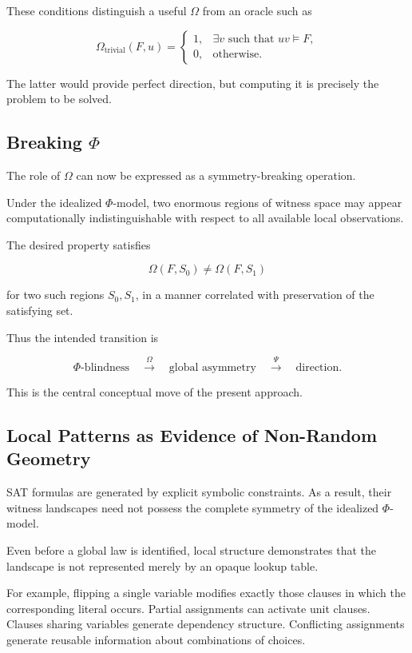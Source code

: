 \documentclass[11pt]{article}
\theoremstyle{plain}
\theoremstyle{definition}
\begin{document}
These conditions distinguish a useful \(\Omega\) from an oracle such as

\[
    \Omega_{\mathrm{trivial}}(F,u)
    =
    \begin{cases}
        1,&\exists v\text{ such that }uv\models F,\\
        0,&\text{otherwise}.
    \end{cases}
\]

The latter would provide perfect direction, but computing it is precisely the
problem to be solved.

\subsection{Breaking \(\Phi\)}

The role of \(\Omega\) can now be expressed as a symmetry-breaking operation.

Under the idealized \(\Phi\)-model, two enormous regions of witness space may
appear computationally indistinguishable with respect to all available local
observations.

The desired property satisfies

\[
    \Omega(F,S_0)\neq\Omega(F,S_1)
\]

for two such regions \(S_0,S_1\), in a manner correlated with preservation of
the satisfying set.

Thus the intended transition is

\[
\boxed{
\Phi\text{-blindness}
\quad
\xrightarrow{\;\Omega\;}
\quad
\text{global asymmetry}
\quad
\xrightarrow{\;\Psi\;}
\quad
\text{direction}.
}
\]

This is the central conceptual move of the present approach.

\subsection{Local Patterns as Evidence of Non-Random Geometry}

SAT formulas are generated by explicit symbolic constraints.  As a result,
their witness landscapes need not possess the complete symmetry of the
idealized \(\Phi\)-model.

Even before a global law is identified, local structure demonstrates that the
landscape is not represented merely by an opaque lookup table.

For example, flipping a single variable modifies exactly those clauses in
which the corresponding literal occurs.  Partial assignments can activate
unit clauses.  Clauses sharing variables generate dependency structure.
Conflicting assignments generate reusable information about combinations of
choices.
\end{document}
